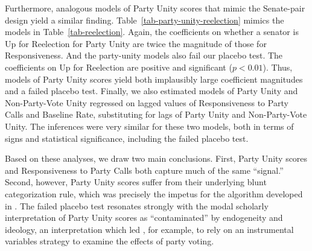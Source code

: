 \documentclass[12pt]{article}
\begin{document}
Furthermore, analogous models of Party Unity scores that mimic the Senate-pair
design yield a similar finding.
Table~\ref{tab-party-unity-reelection} mimics the models in
Table~\ref{tab-reelection}.
Again, the coefficients on whether a senator is Up for Reelection for
Party Unity are twice the
magnitude of those for Responsiveness.
And the party-unity models also fail our placebo test.
The coefficients on Up for Reelection are positive and significant
($p < 0.01$).
Thus, models of Party Unity scores yield both implausibly large coefficient
magnitudes and a failed placebo test.
Finally, we also estimated models of Party Unity and Non-Party-Vote Unity
regressed on lagged values of Responsiveness to Party Calls and Baseline Rate,
substituting for lags of Party Unity and Non-Party-Vote Unity.
The inferences were very similar for these two models, both in terms of
signs and statistical significance, including the failed placebo test.

Based on these analyses, we draw two main conclusions.
First, Party Unity scores and Responsiveness to Party Calls both capture much of
the same ``signal.''
Second, however, Party Unity scores suffer from their underlying blunt
categorization rule, which was precisely the impetus for the algorithm
developed in \cite{Minozzi:2013}. The failed placebo test resonates strongly
with the modal scholarly interpretation of
Party Unity scores as ``contaminated'' by endogeneity and ideology,
an interpretation which led \cite{Carson:2010}, for example, to rely on an
instrumental variables strategy to examine the effects of party voting.

\clearpage




\end{document}

